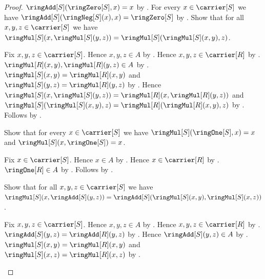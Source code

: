 \begin{proof}
        $\ringAdd[S](\ringZero[S],x)=x$ by
        .
    For every $x\in\carrier[S]$ we have
        $\ringAdd[S](\ringNeg[S](x),x)=\ringZero[S]$ by
        .
    Show that for all $x,y,z\in\carrier[S]$ we have
        $\ringMul[S](x,\ringMul[S](y,z))
            =\ringMul[S](\ringMul[S](x,y),z)$.
    \begin{subproof}
        Fix $x,y,z\in\carrier[S]$.
        Hence $x,y,z\in A$ by
            .
        Hence $x,y,z\in\carrier[R]$ by .
        $\ringMul[R](x,y),\ringMul[R](y,z)\in A$ by
            .
        $\ringMul[S](x,y)=\ringMul[R](x,y)$ and
            $\ringMul[S](y,z)=\ringMul[R](y,z)$ by
            .
        Hence
            $\ringMul[S](x,\ringMul[S](y,z))
                =\ringMul[R](x,\ringMul[R](y,z))$ and
            $\ringMul[S](\ringMul[S](x,y),z)
                =\ringMul[R](\ringMul[R](x,y),z)$ by
            .
        Follows by .
    \end{subproof}
    Show that for every $x\in\carrier[S]$ we have
        $\ringMul[S](\ringOne[S],x)=x$ and
        $\ringMul[S](x,\ringOne[S])=x$.
    \begin{subproof}
        Fix $x\in\carrier[S]$.
        Hence $x\in A$ by .
        Hence $x\in\carrier[R]$ by .
        $\ringOne[R]\in A$ by .
        Follows by
            .
    \end{subproof}
    Show that for all $x,y,z\in\carrier[S]$ we have
        $\ringMul[S](x,\ringAdd[S](y,z))
            =\ringAdd[S](\ringMul[S](x,y),\ringMul[S](x,z))$.
    \begin{subproof}
        Fix $x,y,z\in\carrier[S]$.
        Hence $x,y,z\in A$ by
            .
        Hence $x,y,z\in\carrier[R]$ by .
        $\ringAdd[S](y,z)=\ringAdd[R](y,z)$ by
            .
        Hence $\ringAdd[S](y,z)\in A$ by
            .
        $\ringMul[S](x,y)=\ringMul[R](x,y)$ and
            $\ringMul[S](x,z)=\ringMul[R](x,z)$ by
            .

\end{subproof}
\end{proof}
